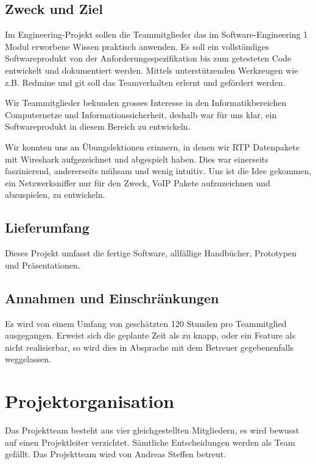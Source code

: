 \documentclass[a4,12pt]{scrartcl}
\begin{document}
\subsection{Zweck und Ziel}
Im Engineering-Projekt sollen die Teammitglieder das im Software-Engineering 1 Modul erworbene Wissen praktisch anwenden. Es soll ein vollständiges Softwareprodukt von der Anforderungsspezifikation bis zum getesteten Code entwickelt und dokumentiert werden. Mittels unterstützenden Werkzeugen wie z.B. Redmine und git soll das Teamverhalten erlernt und gefördert werden. 

Wir Teammitglieder bekunden grosses Interesse in den Informatikbereichen Computernetze und Informationssicherheit, deshalb war für uns klar, ein Softwareprodukt in diesem Bereich zu entwickeln. 

Wir konnten uns an Übungslektionen erinnern, in denen wir RTP Datenpakete mit Wireshark aufgezeichnet und abgespielt haben. Dies war einerseits faszinierend, andererseits mühsam und wenig intuitiv. Uns ist die Idee gekommen, ein Netzwerksniffer nur für den Zweck, VoIP Pakete aufzuzeichnen und abzuspielen, zu entwickeln.    
\subsection{Lieferumfang}
Dieses Projekt umfasst die fertige Software, allfällige Handbücher, Prototypen und Präsentationen.
\subsection{Annahmen und Einschränkungen}
Es wird von einem Umfang von geschätzten 120 Stunden pro Teammitglied ausgegangen. Erweist sich die geplante Zeit als zu knapp, oder ein Feature als nicht realisierbar, so wird dies in Absprache mit dem Betreuer gegebenenfalls weggelassen.
\section{Projektorganisation}
Das Projektteam besteht aus vier gleichgestellten Mitgliedern, es wird bewusst auf einen Projektleiter verzichtet. Sämtliche Entscheidungen werden als Team gefällt. Das Projektteam wird von Andreas Steffen betreut.
\end{document}
